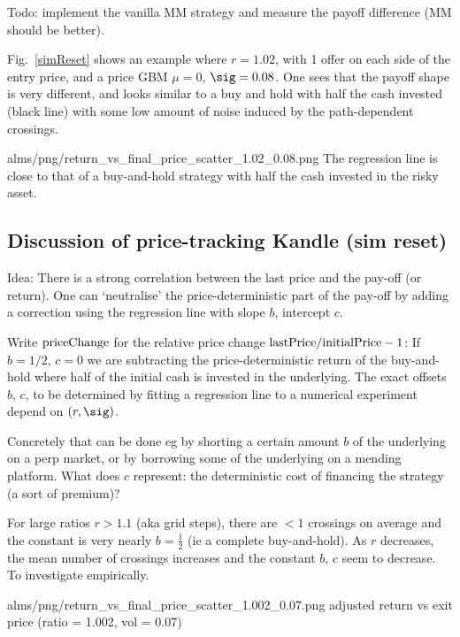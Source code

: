 \documentclass[oneside,12pt]{article}
\begin{document}
Todo: implement the vanilla MM strategy and measure the payoff difference (MM should be better).

Fig.~\ref{simReset} shows an example where $r=1.02$, with 1 offer on each side of the entry price, and a price GBM $\mu=0$, $\sig=0.08$.
One sees that the payoff shape is very different, and looks
similar to a buy and hold with half the cash invested (black line)
with some low amount of noise induced by the path-dependent crossings.


\IG{250pt}
{alms/png/return_vs_final_price_scatter_1.02_0.08.png}
{\label{simReset} The regression line is close to that of a buy-and-hold strategy
with half the cash invested in the risky asset.}


\subsection{Discussion of price-tracking Kandle (sim reset)}

Idea: 
There is a strong correlation between the last price and the pay-off (or return).
One can `neutralise' the price-deterministic part of the pay-off by adding 
a correction using the regression line with slope $b$, intercept $c$. 

Write $\hbox{priceChange}$ for the relative price change
$\hbox{lastPrice}/\hbox{initialPrice} - 1$:
If $b=1/2$, $c=0$ we are subtracting the price-deterministic return of the buy-and-hold
where half of the initial cash is invested in the underlying.
The exact offsets $b$, $c$, to be determined by fitting a regression line
to a numerical experiment depend on $(r,\sig)$.

Concretely that can be done eg by shorting a certain amount $b$ of the underlying on a perp market,
or by borrowing some of the underlying on a mending platform. What does $c$ represent: 
the deterministic cost of financing the strategy (a sort of premium)?

For large ratios $r>1.1$ (aka grid steps), 
there are $<1$ crossings on average and the constant is very nearly $b=\frac12$ (ie a complete buy-and-hold).
As $r$ decreases, the mean number of crossings increases and the constant $b$, $c$ seem to decrease.
To investigate empirically.

\IG{200pt}
{alms/png/return_vs_final_price_scatter_1.002_0.07.png}
{adjusted return vs exit price (ratio = 1.002, vol = 0.07)}
\end{document}
